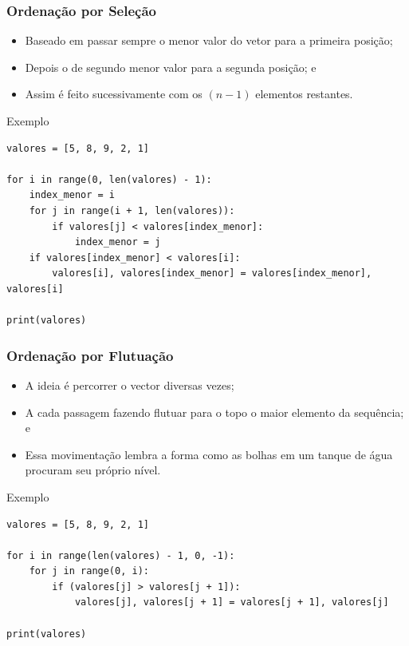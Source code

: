 \documentclass{beamer}
\begin{document}
\begin{frame}[fragile]
\frametitle{Ordenação por Seleção}

\begin{itemize}
	\item Baseado em passar sempre o menor valor do vetor para a primeira posição;
	\item Depois o de segundo menor valor para a segunda posição; e
	\item Assim é feito sucessivamente com os $(n - 1)$ elementos restantes.
\end{itemize}

\begin{exampleblock}{Exemplo}
	\begin{lstlisting}
valores = [5, 8, 9, 2, 1]

for i in range(0, len(valores) - 1):
    index_menor = i
    for j in range(i + 1, len(valores)):
        if valores[j] < valores[index_menor]:
            index_menor = j
    if valores[index_menor] < valores[i]:
        valores[i], valores[index_menor] = valores[index_menor], valores[i]  

print(valores)
	\end{lstlisting}
\end{exampleblock}
\end{frame}

\begin{frame}[fragile]
\frametitle{Ordenação por Flutuação}

\begin{itemize}
	\item A ideia é percorrer o vector diversas vezes;
	\item A cada passagem fazendo flutuar para o topo o maior elemento da
	sequência; e
	\item Essa movimentação lembra a forma como as bolhas em um tanque de
	água procuram seu próprio nível.
\end{itemize}

\begin{exampleblock}{Exemplo}
	\begin{lstlisting}
valores = [5, 8, 9, 2, 1]

for i in range(len(valores) - 1, 0, -1):
    for j in range(0, i):
        if (valores[j] > valores[j + 1]):
            valores[j], valores[j + 1] = valores[j + 1], valores[j] 

print(valores)
	\end{lstlisting}
\end{exampleblock}
\end{frame}
\end{document}
